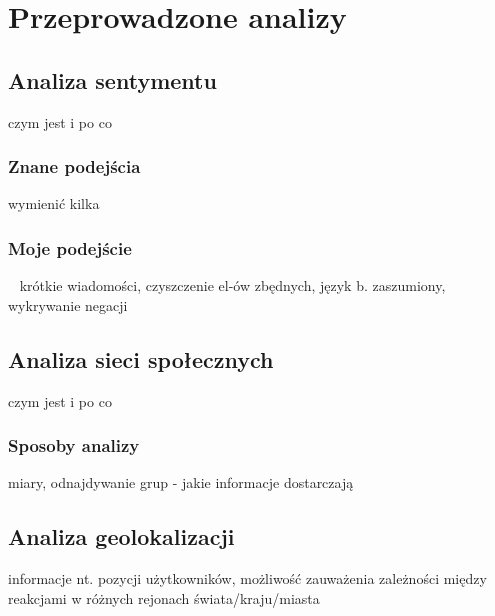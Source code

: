 \chapter{Przeprowadzone analizy}
\section{Analiza sentymentu}
czym jest i po co
\subsection{Znane podejścia}
wymienić kilka \subsection{Moje podejście}\
\label{sec:sentyment-moje-podejscie}
krótkie wiadomości, czyszczenie el-ów zbędnych, język b. zaszumiony, wykrywanie
negacji
\section{Analiza sieci społecznych}
czym jest i po co
\subsection{Sposoby analizy}
miary, odnajdywanie grup - jakie informacje dostarczają
\section{Analiza geolokalizacji}
informacje nt. pozycji użytkowników, możliwość zauważenia zależności między
reakcjami w różnych rejonach świata/kraju/miasta
